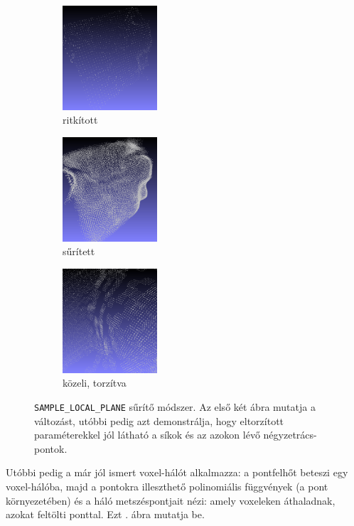 \documentclass[a4paper,oneside]{article}
\begin{document}
\begin{figure}[tbh]
  \centering
  \begin{subfigure}[b]{.32\linewidth}
	\centering
	\includegraphics[width=100pt]{figs/plane00.png}
	\caption{ritkított \label{fig:upsampling-plane1}}
  \end{subfigure}%
  \begin{subfigure}[b]{.32\linewidth}
	\centering
	\includegraphics[width=100pt]{figs/plane01.png}
	\caption{sűrített \label{fig:upsampling-plane2}}
  \end{subfigure}%
  \begin{subfigure}[b]{.32\linewidth}
	\centering
	\includegraphics[width=100pt]{figs/plane02.png}
	\caption{közeli, torzítva \label{fig:upsampling-plane3}}
  \end{subfigure}%
\caption{\texttt{SAMPLE\_LOCAL\_PLANE} sűrítő módszer. Az első két ábra mutatja a változást, utóbbi pedig azt demonstrálja, hogy eltorzított paraméterekkel jól látható a síkok és az azokon lévő négyzetrács-pontok. \label{fig:upsampling-plane}}
\end{figure}

Utóbbi pedig a már jól ismert voxel-hálót alkalmazza: a pontfelhőt beteszi egy voxel-hálóba, majd a pontokra illeszthető polinomiális függvények (a pont környezetében) és a háló metszéspontjait nézi: amely voxeleken áthaladnak, azokat feltölti ponttal. Ezt . ábra mutatja be.
\end{document}
